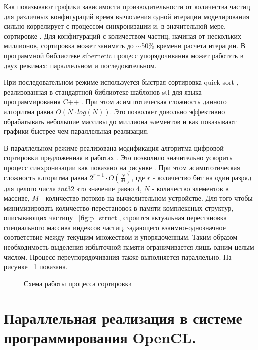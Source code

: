 Как показывают графики зависимости производительности от количества частиц для различных конфигураций время вычисления одной итерации моделирования сильно коррелирует с процессом синхронизации и, в значительной мере, сортировке . Для  конфигураций с количеством частиц, начиная от нескольких миллионов, сортировка может занимать до \(\sim \)50\% времени расчета итерации. В программной библиотеке sibernetic \cite{Palyanov2016} процесс упорядочивания может работать в двух режимах: параллельном и последовательном. 

При последовательном режиме используется быстрая сортировка quick sort \cite{Hoare1962}, реализованная в стандартной библиотеке шаблонов stl \cite{Stepanov1995} для языка программирования C++ \cite{Strosudo snap install --classic goustrup2013}. При этом асимптотическая сложность данного алгоритма равна \( O(N \cdot log(N)) \). Это позволяет довольно эффективно обрабатывать небольшие массивы до миллиона элементов и как показывают графики быстрее чем параллельная реализация. 

В параллельном режиме реализована модификация алгоритма цифровой сортировки предложенная в работах \cite{Knuth1998, Marcho1991}. Это позволило значительно ускорить процесс синхронизации как показано на рисунке . При этом асимптотическая сложность алгоритма равна \( 2^{r-1} \cdot O(\frac{N}{M}) \), где \( r \) - количество бит на один разряд для целого числа \( int32 \) это значение равно 4, \( N \) - количество элементов в массиве, \( M \) - количество потоков на вычислительном устройстве. Для того чтобы минимизировать количество перестановок в памяти комплексных структур, описывающих частицу ~\ref{fig:p_struct}, строится актуальная перестановка специального массива  индексов частиц, задающего взаимно-однозначное соответствие между текущим множеством и упорядоченным. Таким образом необходимость выделения избыточной памяти ограничивается лишь одним целым числом. 
Процесс переупорядочивания также выполняется параллельно.  На рисунке ~\ref{fig:sort1} показана. 
\begin{figure}[ht]
  \caption{Схема работы процесса сортировки}\label{fig:sort1}
\end{figure}

\section{Параллельная реализация в системе программирования OpenCL.}\label{sec:ch3/sect3}

